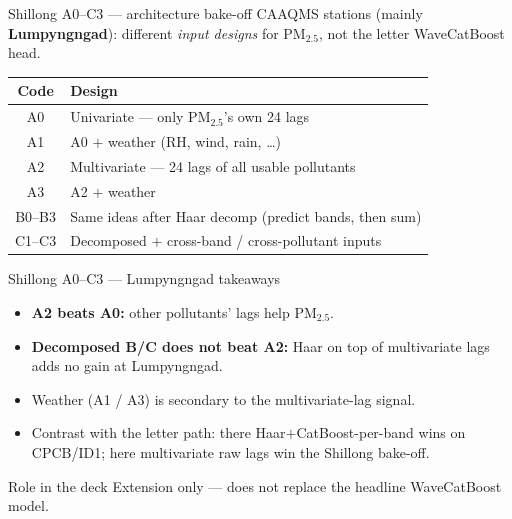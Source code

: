 \begin{frame}{Shillong A0--C3 --- architecture bake-off}
  {\footnotesize
  CAAQMS stations (mainly \textbf{Lumpyngngad}): different \emph{input designs}
  for PM$_{2.5}$, not the letter WaveCatBoost head.
  }
  \vspace{0.25em}
  {\scriptsize
  \centering
  \begin{tabular}{cl}
    \toprule
    Code & Design \\
    \midrule
    A0 & Univariate --- only PM$_{2.5}$'s own 24 lags \\
    A1 & A0 $+$ weather (RH, wind, rain, \ldots) \\
    A2 & Multivariate --- 24 lags of all usable pollutants \\
    A3 & A2 $+$ weather \\
    B0--B3 & Same ideas after Haar decomp (predict bands, then sum) \\
    C1--C3 & Decomposed $+$ cross-band / cross-pollutant inputs \\
    \bottomrule
  \end{tabular}
  }
\end{frame}

\begin{frame}{Shillong A0--C3 --- Lumpyngngad takeaways}
  \begin{itemize}\setlength\itemsep{0.55em}
    \item \textbf{A2 beats A0:} other pollutants' lags help PM$_{2.5}$.
    \item \textbf{Decomposed B/C does not beat A2:} Haar on top of multivariate
          lags adds no gain at Lumpyngngad.
    \item Weather (A1 / A3) is secondary to the multivariate-lag signal.
    \item Contrast with the letter path: there Haar$+$CatBoost-per-band wins on
          CPCB/ID1; here multivariate raw lags win the Shillong bake-off.
  \end{itemize}
  \vspace{0.35em}
  \begin{exampleblock}{Role in the deck}
    Extension only --- does not replace the headline WaveCatBoost model.
  \end{exampleblock}
\end{frame}

